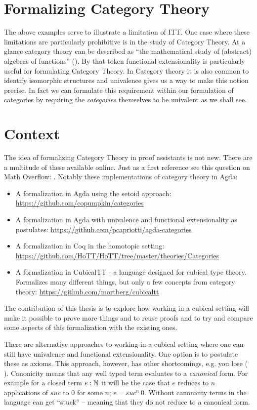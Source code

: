 \section{Formalizing Category Theory}
%
The above examples serve to illustrate a limitation of ITT. One case where these
limitations are particularly prohibitive is in the study of Category Theory. At
a glance category theory can be described as ``the mathematical study of
(abstract) algebras of functions'' (\cite{awodey-2006}). By that token
functional extensionality is particularly useful for formulating Category
Theory. In Category theory it is also common to identify isomorphic structures
and univalence gives us a way to make this notion precise. In fact we can
formulate this requirement within our formulation of categories by requiring the
\emph{categories} themselves to be univalent as we shall see.

\section{Context}
\label{sec:context}
%
The idea of formalizing Category Theory in proof assistants is not new. There
are a multitude of these available online. Just as a first reference see this
question on Math Overflow: \cite{mo-formalizations}. Notably these
implementations of category theory in Agda:
%
\begin{itemize}
\item
  A formalization in Agda using the setoid approach:
  \url{https://github.com/copumpkin/categories}
\item
  A formalization in Agda with univalence and functional
  extensionality as postulates:
  \url{https://github.com/pcapriotti/agda-categories}
\item
  A formalization in Coq in the homotopic setting:
  \url{https://github.com/HoTT/HoTT/tree/master/theories/Categories}
\item
  A formalization in CubicalTT - a language designed for cubical type theory.
  Formalizes many different things, but only a few concepts from category
  theory:
  \url{https://github.com/mortberg/cubicaltt}
\end{itemize}
%
The contribution of this thesis is to explore how working in a cubical setting
will make it possible to prove more things and to reuse proofs and to try and
compare some aspects of this formalization with the existing ones.

There are alternative approaches to working in a cubical setting where
one can still have univalence and functional extensionality. One
option is to postulate these as axioms. This approach, however, has
other shortcomings, e.g. you lose 
( \cite{huber-2016}). Canonicity means that any well
typed term evaluates to a \emph{canonical} form. For example for a
closed term $e \mathrel{:} \mathbb{N}$ it will be the case that $e$ reduces to $n$
applications of $\mathit{suc}$ to $0$ for some $n$; $e =
\mathit{suc}^n\ 0$. Without canonicity terms in the language can get
``stuck'' -- meaning that they do not reduce to a canonical form.

